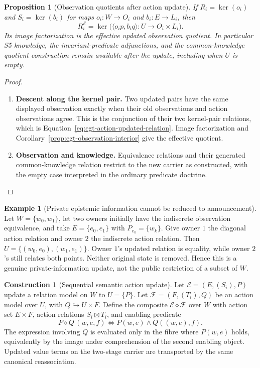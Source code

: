 \documentclass[11pt,a4paper]{article}
\numberwithin{equation}{section}
\newtheorem{proposition}[theorem]{Proposition}
\theoremstyle{definition}
\newtheorem{example}[theorem]{Example}
\newtheorem{construction}[construction]{Construction}
\theoremstyle{remark}
\theoremstyle{plain}
\begin{document}
\begin{proposition}[Observation quotients after action update]
\label{prop:egt-action-observation-quotient}
If $R_i=\ker(o_i)$ and $S_i=\ker(b_i)$ for maps
$o_i:W\to O_i$ and $b_i:E\to L_i$, then
\[
 R_i^{\mathcal E}
 =\ker\bigl(\langle o_ip,b_iq\rangle:U\to O_i\times L_i\bigr).
\]
Its image factorization is the effective updated observation quotient.
In particular S5 knowledge, the invariant-predicate adjunctions, and
the common-knowledge quotient construction remain available after the
update, including when $U$ is empty.
\end{proposition}
\begin{proof}
\leavevmode
\begin{enumerate}[label=\textup{(\arabic*)},leftmargin=*,itemsep=4pt,topsep=3pt]
  \item \textbf{Descent along the kernel pair.} Two updated pairs have the same displayed observation exactly when
their old observations and action observations agree. This is the
conjunction of their two kernel-pair relations, which is
Equation~\eqref{eq:egt-action-updated-relation}. Image factorization
and Corollary~\ref{prop:egt-observation-interior} give the effective
quotient.
  \item \textbf{Observation and knowledge.} Equivalence relations and their generated common-knowledge
relation restrict to the new carrier as constructed, with the empty
case interpreted in the ordinary predicate doctrine.
\end{enumerate}
\end{proof}

\begin{example}[Private epistemic information cannot be reduced to announcement]
Let $W=\{w_0,w_1\}$, let two owners initially have the indiscrete
observation equivalence, and take $E=\{e_0,e_1\}$ with
$P_{e_k}=\{w_k\}$. Give owner $1$ the diagonal action relation and
owner $2$ the indiscrete action relation. Then
$U=\{(w_0,e_0),(w_1,e_1)\}$. Owner $1$'s updated relation is equality,
while owner $2$'s still relates both points. Neither original state is
removed. Hence this is a genuine private-information update, not the
public restriction of a subset of $W$.
\end{example}

\begin{construction}[Sequential semantic action update]
\label{con:egt-action-sequential}
Let $\mathcal E=(E,(S_i),P)$ update a relation model on $W$ to
$U=\{P\}$. Let $\mathcal F=(F,(T_i),Q)$ be an action model over
$U$, with $Q\hookrightarrow U\times F$. Define the composite
$\mathcal E\diamond\mathcal F$ over $W$ with action set $E\times F$,
action relations $S_i\boxtimes T_i$, and enabling predicate
\begin{equation}\label{eq:egt-action-composite-precondition}
 P\diamond Q\,(w,e,f)
 \Longleftrightarrow
 P(w,e)\wedge Q((w,e),f).
\end{equation}
The expression involving $Q$ is evaluated only in the fibre where
$P(w,e)$ holds, equivalently by the image under comprehension of the
second enabling object. Updated value terms on the two-stage carrier
are transported by the same canonical reassociation.
\end{construction}
\end{document}
